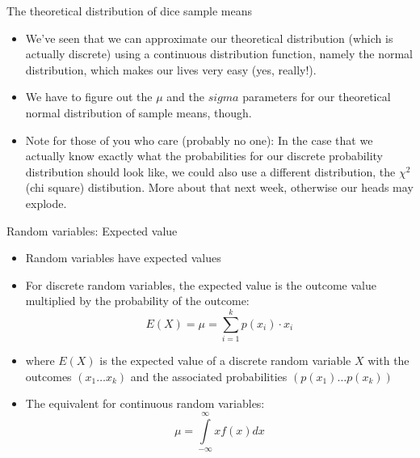 \begin{frame}{The theoretical distribution of dice sample means}

\begin{itemize}
\itemsep1pt\parskip0pt
\item
  We've seen that we can approximate our theoretical distribution (which
  is actually discrete) using a continuous distribution function, namely
  the normal distribution, which makes our lives very easy (yes,
  really!).
\item
  We have to figure out the \(\mu\) and the \(sigma\) parameters for our
  theoretical normal distribution of sample means, though.
\item
  Note for those of you who care (probably no one): In the case that we
  actually know exactly what the probabilities for our discrete
  probability distribution should look like, we could also use a
  different distribution, the \(\chi^2\) (chi square) distibution. More
  about that next week, otherwise our heads may explode.
\end{itemize}

\end{frame}

\begin{frame}{Random variables: Expected value}

\begin{itemize}
\itemsep1pt\parskip0pt
\item
  Random variables have expected values
\item
  For discrete random variables, the expected value is the outcome value
  multiplied by the probability of the outcome:
  \[ E(X) = \mu = \sum\limits_{i=1}^k p(x_i)\cdot x_i\]
\item
  where \(E(X)\) is the expected value of a discrete random variable
  \(X\) with the outcomes \((x_1 \dots x_k)\) and the associated
  probabilities \((p(x_1)\dots p(x_k))\)
\item
  The equivalent for continuous random variables:
  \[\mu = \int\limits_{-\infty}^{\infty}x f(x) dx\]
\end{itemize}

\end{frame}

